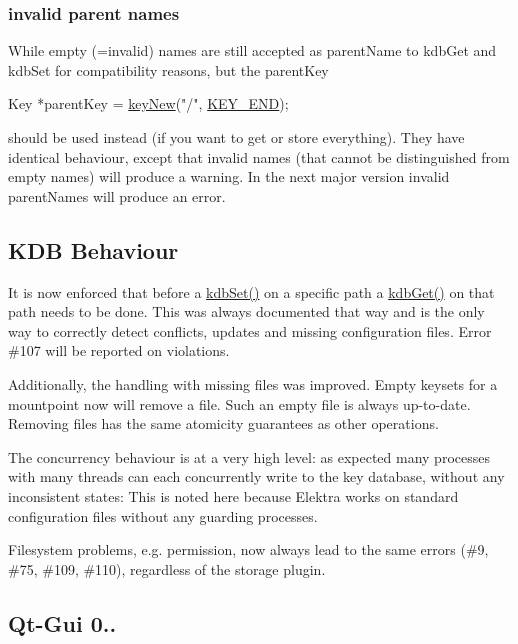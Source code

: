\subsubsection*{invalid parent names}

While empty (=invalid) names are still accepted as parent\+Name to {\ttfamily kdb\+Get} and {\ttfamily kdb\+Set} for compatibility reasons, but the parent\+Key


\begin{DoxyCode}
Key *parentKey = \hyperlink{group__key_gad23c65b44bf48d773759e1f9a4d43b89}{keyNew}(\textcolor{stringliteral}{"/"}, \hyperlink{group__key_gga91fb3178848bd682000958089abbaf40aa8adb6fcb92dec58fb19410eacfdd403}{KEY\_END});
\end{DoxyCode}


should be used instead (if you want to get or store everything). They have identical behaviour, except that invalid names (that cannot be distinguished from empty names) will produce a warning. In the next major version invalid parent\+Names will produce an error.

\subsection*{K\+DB Behaviour}

It is now enforced that before a \hyperlink{group__kdb_ga11436b058408f83d303ca5e996832bcf}{kdb\+Set()} on a specific path a \hyperlink{group__kdb_ga28e385fd9cb7ccfe0b2f1ed2f62453a1}{kdb\+Get()} on that path needs to be done. This was always documented that way and is the only way to correctly detect conflicts, updates and missing configuration files. Error \#107 will be reported on violations.

Additionally, the handling with missing files was improved. Empty keysets for a mountpoint now will remove a file. Such an empty file is always up-\/to-\/date. Removing files has the same atomicity guarantees as other operations.

The concurrency behaviour is at a very high level\+: as expected many processes with many threads can each concurrently write to the key database, without any inconsistent states\+: This is noted here because Elektra works on standard configuration files without any guarding processes.

Filesystem problems, e.\+g. permission, now always lead to the same errors (\#9, \#75, \#109, \#110), regardless of the storage plugin.

\subsection*{Qt-\/\+Gui 0..}

